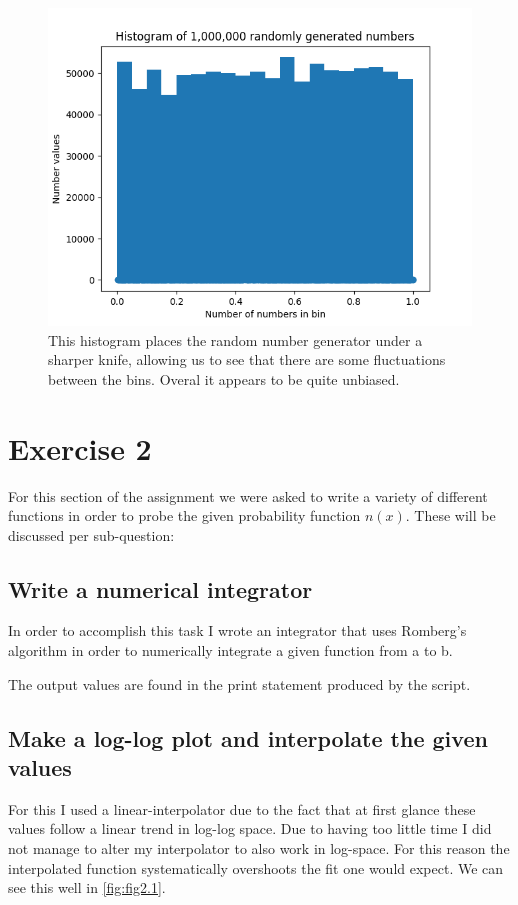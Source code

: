 \documentclass[a4paper,10pt]{article}
\begin{document}
\begin{figure}[h!]
  \centering
  \includegraphics[width=0.9\linewidth]{./plots/1_b_2.png}
  \caption{This histogram places the random number generator under a sharper knife, allowing us to see that there are some fluctuations between the bins. Overal it appears to be quite unbiased.}
  \label{fig:fig1.2}
\end{figure}
 
\section{Exercise 2}

For this section of the assignment we were asked to write a variety of different functions in order to probe the given probability function $n(x)$. These will be discussed per sub-question:

\subsection{Write a numerical integrator}

In order to accomplish this task I wrote an integrator that uses Romberg's algorithm in order to numerically integrate a given function from a to b.  

The output values are found in the print statement produced by the script.

\subsection{Make a log-log plot and interpolate the given values}

For this I used a linear-interpolator due to the fact that at first glance these values follow a linear trend in log-log space. Due to having too little time I did not manage to alter my interpolator to also work in log-space. For this reason the interpolated function systematically overshoots the fit one would expect. We can see this well in \ref{fig:fig2.1}. 
\end{document}
